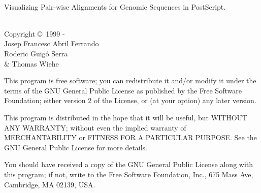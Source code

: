 %
%
%
%
%

\begin{center}
\begin{ttfamily}
\fbox{\Huge\hspace{2cm}\prog\ {\huge\ver}\hspace{2cm}}\\[20pt]

\begin{flushleft}
Visualizing Pair-wise Alignments for Genomic Sequences in PostScript.
\end{flushleft}\vspace{1cm}

\\[28pt]

Copyright \copyright\ 1999 - \lastyear \\
Josep Francesc Abril Ferrando{\,\footnotesize\raisebox{0.75ex}{$\dag$}} \\
Roderic Guig\'o Serra{\,\footnotesize\raisebox{0.75ex}{$\dag$}} \\
\& Thomas Wiehe{\,\footnotesize\raisebox{0.75ex}{$\ddag$}}
\vspace{15pt}

\begin{flushleft}
This program is free software; you can redistribute it and/or modify
it under the terms of the GNU General Public License as published by
the Free Software Foundation; either version 2 of the License, or
(at your option) any later version.\vspace{2.5ex}

This program is distributed in the hope that it will be useful,
but WITHOUT ANY WARRANTY; without even the implied warranty of
MERCHANTABILITY or FITNESS FOR A PARTICULAR PURPOSE.  See the
GNU General Public License for more details.\vspace{2.5ex}

You should have received a copy of the GNU General Public License
along with this program; if not, write to the Free Software
Foundation, Inc., 675 Mass Ave, Cambridge, MA 02139, USA.\vspace{20pt}


\end{flushleft}
\end{ttfamily}
\end{center}
